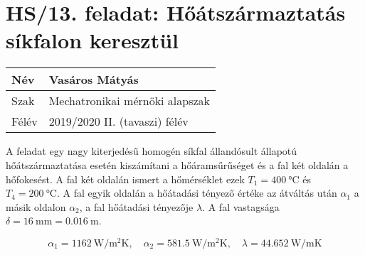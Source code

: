 \section*{HS/13. feladat: Hőátszármaztatás síkfalon keresztül}

\begin{tabular}{ | p{2cm} | p{14cm} | } 
	\hline
	Név & Vasáros Mátyás \\ 
	\hline
	Szak & Mechatronikai mérnöki alapszak\\ 
	\hline
	Félév & 2019/2020 II. (tavaszi) félév \\ 
	\hline
\end{tabular}
\vspace{0.5cm}

\noindent A feladat egy nagy kiterjedésű homogén síkfal állandósult állapotú hőátszármaztatása esetén kiszámítani a hőáramsűrűséget és a fal két oldalán a hőfokesést. A fal két oldalán ismert a hőmérséklet ezek $T_{1}=\SI{400}{\degreeCelsius}$ és $T_{4}=\SI{200}{\degreeCelsius}$. A fal egyik oldalán a hőátadási tényező értéke az átváltás után $\alpha_1$ a másik oldalon $\alpha_2$, a fal hőátadási tényezője $\lambda$. A fal vastagsága $\delta=\SI {16}{\milli\meter}=\SI {0,016}{\meter}$.

\begin{equation*}
	\alpha_1=\SI{1162}{\watt\per\meter\squared\kelvin},
\quad 
	\alpha_2=\SI{581,5}{\watt\per\meter\squared\kelvin},
\quad 
	\lambda=\SI{44,652}{\watt\per\meter\kelvin}
\end{equation*}

\noindent\hrulefill

